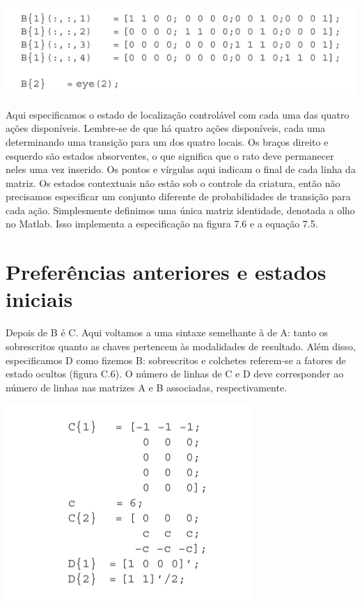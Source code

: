 \documentclass[
  12pt,
]{book}
\begin{document}
\includegraphics{images/Figura_C5.png}

Aqui especificamos o estado de localização controlável com cada uma das quatro ações disponíveis. Lembre-se de que há quatro ações disponíveis, cada uma determinando uma transição para um dos quatro locais. Os braços direito e esquerdo são estados absorventes, o que significa que o rato deve permanecer neles uma vez inserido. Os pontos e vírgulas aqui indicam o final de cada linha da matriz. Os estados contextuais não estão sob o controle da criatura, então não precisamos especificar um conjunto diferente de probabilidades de transição para cada ação. Simplesmente definimos uma única matriz identidade, denotada a olho no Matlab. Isso implementa a especificação na figura 7.6 e a equação 7.5.

\hypertarget{preferuxeancias-anteriores-e-estados-iniciais}{%
\section{Preferências anteriores e estados iniciais}\label{preferuxeancias-anteriores-e-estados-iniciais}}

Depois de B é C. Aqui voltamos a uma sintaxe semelhante à de A: tanto os sobrescritos quanto as chaves pertencem às modalidades de resultado. Além disso, especificamos D como fizemos B: sobrescritos e colchetes referem-se a fatores de estado ocultos (figura C.6). O número de linhas de C e D deve corresponder ao número de linhas nas matrizes A e B associadas, respectivamente.

\includegraphics{images/Figura_C6.png}
\end{document}
